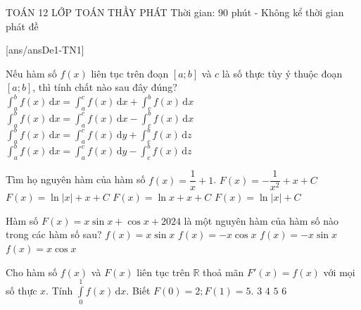 ﻿\begin{name}
	{\tenchude}
	{TOÁN 12}
	{LỚP TOÁN THẦY PHÁT}
	{Thời gian: 90 phút - Không kể thời gian phát đề}
\end{name}
[ans/ansDe1-TN1]
\begin{ex}%
Nếu hàm số $f(x)$ liên tục trên đoạn $[a;b]$ và $c$ là số thực tùy ý thuộc đoạn $[a;b]$, thì tính chất nào sau đây đúng?
\choice
{\True $\displaystyle\int_a^b f(x) \mathrm{\,d}x = \displaystyle\int_a^c f(x) \mathrm{\,d}x + \displaystyle\int_c^b f(x)\mathrm{\,d}x$}
{$\displaystyle\int_a^b f(x)\mathrm{\,d}x = \displaystyle\int_a^c f(x) \mathrm{\,d}x - \displaystyle\int_c^b f(x) \mathrm{\,d}x$}
{$\displaystyle\int_a^b f(x)\mathrm{\,d}x = \displaystyle\int_a^c f(x)\mathrm{\,d}y + \displaystyle\int_c^b f(x) \mathrm{\,d}z$}
{$\displaystyle\int_a^b f(x)\mathrm{\,d}x = \displaystyle\int_a^c f(x)\mathrm{\,d}y - \displaystyle\int_c^b f(x)\mathrm{\,d}z$}
\end{ex}

\begin{ex}%
Tìm họ nguyên hàm của hàm số $f(x)=\dfrac{1}{x}+1$. \choice
{$F(x)=-\dfrac{1}{x^2}+x+C$}
{\True $F(x)=\ln |x|+x+C$}
{$F(x)=\ln x+x+C$}
{$F(x)=\ln |x|+C$}
\end{ex}

\begin{ex}%
Hàm số $F(x)=x\sin x+\cos x+2024$ là một nguyên hàm của hàm số nào trong các hàm số sau?
\choice
{ $f(x)=x\sin x$ }
{ $f(x)=-x\cos x$ }
{ $f(x)=-x\sin x$ }
{\True $f(x)=x\cos x$ }
\end{ex}

\begin{ex}%
Cho hàm số $f(x)$ và $F(x)$ liên tục trên $\mathbb{R}$ thoả mãn $F'(x)=f(x)$ với mọi số thực $x$. Tính   $\displaystyle \int\limits_0^1 f(x)\mathrm{\,d}x$. Biết $F(0)=2; F(1)=5$.
\choice
{\True $3$}
{$4$}
{$5$}
{$6$}
\end{ex}


